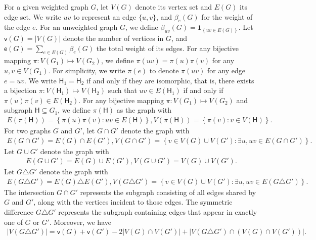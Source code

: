 \documentclass[letterpaper,11pt]{article}
\theoremstyle{definition}
\newcommand{\en}{\mathsf{{e}}}
\newcommand{\vn}{\mathsf{{v}}}
\newcommand{\sth}[1]{\left\{ #1 \right\}}
\newcommand{\sfH}{{\mathsf{H}}}
\newcommand{\indc}[1]{{\mathbf{1}_{\left\{{#1}\right\}}}}
\begin{document}
For a given weighted graph $G$, let $V(G)$ denote its vertex set and $E(G)$ its edge set. 
We write $uv$ to represent an edge $\{u,v\}$, and $\beta_{e}(G)$ for the weight of the edge $e$. 
 For an unweighted graph $G$, we define $\beta_{uv}(G)=\indc{uv\in E(G)}$.
Let $\vn(G)=|V(G)|$ denote the number of vertices in $G$, and $\en(G)=\sum_{e\in E(G)} \beta_{e}(G)$ the total weight of its edges. For any bijective mapping $\pi:V(G_1)\mapsto V(G_2)$, we define  $\pi(uv) = \pi(u)\pi(v)$ for any $u,v\in V(G_1)$. For simplicity, we write $\pi(e)$ to denote $\pi(uv)$ for any edge $e =uv$.
We write $\sfH_1 = \sfH_2$ if and only if they are isomorphic, that is, there exists a bijection $\pi:V(\sfH_1)\mapsto V(\sfH_2)$ such that $uv\in E(\sfH_1)$ if and only if $\pi(u)\pi(v)\in E(\sfH_2)$.
For any bijective mapping $\pi: V(G_1)\mapsto V(G_2)$ and subgraph $\sfH\subseteq G_1$, we define $\pi(\sfH)$ as the graph with\begin{align}\label{eq:def-piH}
    E(\pi(\sfH)) = \sth{\pi(u)\pi(v):uv\in E(\sfH)},V(\pi(\sfH)) = \sth{\pi(v):v\in V(\sfH)}.
\end{align}
For two graphs $G$ and $G'$, let $G\cap G'$ denote the graph with\begin{align}\label{eq:intersec-graph}
    E(G\cap G') = E(G)\cap E(G'), V(G\cap G') = \sth{v\in V(G)\cup V(G'):\exists u, uv\in E(G\cap G')}.
\end{align}
Let $G\cup G'$ denote the graph with
\begin{align}\label{eq:union-graph}
    E(G\cup G') = E(G)\cup E(G'),V(G\cup G') = V(G)\cup V(G').
\end{align}
Let $G\triangle G'$ denote the graph with 
\begin{align}\label{eq:triangle-graph}
    E(G\triangle G') = E(G)\triangle E(G'), V(G\triangle G') = \sth{v\in V(G)\cup V(G'):\exists u, uv\in E(G\triangle G')}.
\end{align}
The intersection $G \cap G'$ represents the subgraph consisting of all edges shared by $G$ and $G'$, along with the vertices incident to those edges.
The symmetric difference $G \triangle G'$ represents the subgraph containing edges that appear in exactly one of $G$ or $G'$. Moreover, we have \begin{align*}
    |V(G\triangle G')| = \vn(G)+\vn(G')-2|V(G)\cap V(G')|+|V(G\triangle G')\cap (V(G)\cap V(G'))|.
\end{align*} 

 


\end{document}
